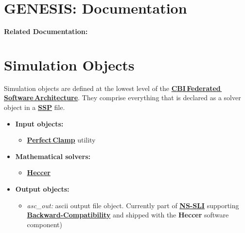 \documentclass[12pt]{article}
\begin{document}
\section*{GENESIS: Documentation}

{\bf Related Documentation:}

\section*{Simulation Objects}

Simulation objects are defined at the lowest level of the \href{../genesis-overview/genesis-overview.tex}{\bf CBI\,Federated\,Software\,Architecture}. They comprise everything that is declared as a solver object in a \href{../ssp/ssp.tex}{\bf SSP} file.

\begin{itemize}

\item {\bf Input objects:}
   \begin{itemize}
      \item \href{../pclamp/pclamp.tex}{\bf Perfect\,Clamp} utility
   \end{itemize}
   
\item{\bf Mathematical solvers:}
   \begin{itemize}
      \item \href{../heccer/heccer.tex}{\bf Heccer}
   \end{itemize}
   
\item {\bf Output objects:}
   \begin{itemize}
      \item {\it asc\_out:} ascii output file object. Currently part of \href{../nssli/nssli.tex}{\bf NS-SLI} supporting \href{../backward-compatibility/backward-compatibility.tex}{\bf Backward-Compatibility} and shipped with the {\bf Heccer} software component)
   \end{itemize}

\end{itemize}
\end{document}
